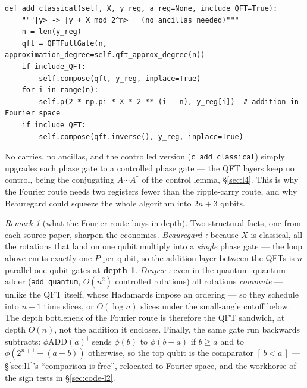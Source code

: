 \documentclass[11pt]{article}
\newcommand{\code}[1]{\texttt{#1}}
\theoremstyle{plain}
\theoremstyle{remark}
\newtheorem*{remark}{Remark}
\begin{document}
\begin{lstlisting}
def add_classical(self, X, y_reg, a_reg=None, include_QFT=True):
    """|y> -> |y + X mod 2^n>   (no ancillas needed)"""
    n = len(y_reg)
    qft = QFTFullGate(n, approximation_degree=self.qft_approx_degree(n))
    if include_QFT:
        self.compose(qft, y_reg, inplace=True)
    for i in range(n):
        self.p(2 * np.pi * X * 2 ** (i - n), y_reg[i])  # addition in Fourier space
    if include_QFT:
        self.compose(qft.inverse(), y_reg, inplace=True)
\end{lstlisting}

\noindent
No carries, no ancillas, and the controlled version (\code{c\_add\_classical}) simply upgrades each
phase gate to a controlled phase gate --- the QFT layers keep no control, being the conjugating
$A\cdots A^\dagger$ of the control lemma, \S\ref{sec:l4}. This is why the Fourier route needs two
registers fewer than the ripple-carry route, and why Beauregard \cite{beauregard} could squeeze the
whole algorithm into $2n+3$ qubits.

\begin{remark}[what the Fourier route buys in depth]
Two structural facts, one from each source paper, sharpen the economics. \emph{Beauregard
\cite{beauregard}:} because $X$ is classical, all the rotations that land on one qubit multiply
into a \emph{single} phase gate --- the loop above emits exactly one $P$ per qubit, so the
addition layer between the QFTs is $n$ parallel one-qubit gates at \textbf{depth 1}.
\emph{Draper \cite{draper}:} even in the quantum--quantum adder (\code{add\_quantum}, $O(n^2)$
controlled rotations) all rotations \emph{commute} --- unlike the QFT itself, whose Hadamards
impose an ordering --- so they schedule into $n{+}1$ time slices, or $O(\log n)$ slices under the
small-angle cutoff below. The depth bottleneck of the Fourier route is therefore the QFT sandwich,
at depth $O(n)$, not the addition it encloses. Finally, the same gate run backwards subtracts:
$\phi\mathrm{ADD}(a)^\dagger$ sends $\phi(b)$ to $\phi(b-a)$ if $b\ge a$ and to
$\phi(2^{n+1}-(a-b))$ otherwise, so the top qubit is the comparator $[\,b<a\,]$ ---
\S\ref{sec:l1}'s ``comparison is free'', relocated to Fourier space, and the workhorse of the sign
tests in \S\ref{sec:code-l2}.
\end{remark}
\end{document}
